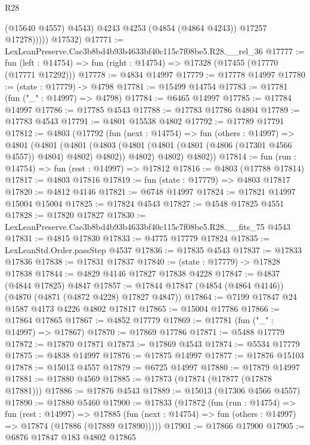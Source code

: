 \begin{lexlean}{R28}
\begin{coremodule}
                  (@15640 @4557)
                  @4543)
                @4243
                @4253
                (@4854 (@4864 @4243))
                @17257
                @17278)))))
      @17532)
@17771 := LexLeanPreserve.Cae3b8bd4b93b4633bf40c115c7f08be5.R28.__rel_36
@17777 := fun (left : @14754) => fun (right : @14754) => @17328 (@17455 (@17770 (@17771 @17292)))
@17778 := @4834 @14997
@17779 := @17778 @14997
@17780 := (state : @17779) -> @4798
@17781 := @15499 @14754
@17783 := @17781 (fun ("_" : @14997) => @4798)
@17784 := @6465 @14997
@17785 := @17784 @14997
@17786 := @17785 @4543
@17788 := @17783 @17786 @4804
@17789 := @17783 @4543
@17791 := @4801 @15538 @4802
@17792 := @17789 @17791
@17812 := @4803
    (@17792
      (fun (next : @14754) =>
      fun (others : @14997) =>
      @4801
        (@4801
          (@4801
            (@4803 (@4801 (@4801 (@4801 (@4806 (@17301 @4566 @4557)) @4804) @4802) @4802))
            @4802)
          @4802)
        @4802))
@17814 := fun (run : @14754) => fun (rest : @14997) => @17812
@17816 := @4803 (@17788 @17814)
@17817 := @4803 @17816
@17819 := fun (state : @17779) => @4803 @17817
@17820 := @4812 @4146
@17821 := @6748 @14997
@17824 := @17821 @14997 @15004 @15004
@17825 := @17824 @4543
@17827 := @4548 @17825 @4551
@17828 := @17820 @17827
@17830 := LexLeanPreserve.Cae3b8bd4b93b4633bf40c115c7f08be5.R28.__fits_75 @4543
@17831 := @4815 @17830
@17833 := @4775 @17779 @17824
@17835 := LexLeanStd.Order.passStep @4537
@17836 := @17835 @4543
@17837 := @17833 @17836
@17838 := @17831 @17837
@17840 := (state : @17779) -> @17828 @17838
@17844 := @4829 @4146 @17827 @17838 @4228
@17847 := @4837 (@4844 @17825) @4847
@17857 := @17844 @17847 (@4854 (@4864 @4146)) (@4870 (@4871 (@4872 @4228) @17827 @4847))
@17864 := @7199 @17847 @24 @1587 @4173 @4226 @4802 @17817
@17865 := @15004 @17786
@17866 := @17864 @17865
@17867 := @4852 @17779
@17869 := @17781 (fun ("_" : @14997) => @17867)
@17870 := @17869 @17786
@17871 := @5488 @17779
@17872 := @17870 @17871
@17873 := @17869 @4543
@17874 := @5534 @17779
@17875 := @4838 @14997
@17876 := @17875 @14997
@17877 := @17876 @15103
@17878 := @15013 @4557
@17879 := @6725 @14997
@17880 := @17879 @14997
@17881 := @17880 @4569
@17885 := @17873 (@17874 (@17877 (@17878 @17881)))
@17886 := @17876 @4543
@17889 := @15013 (@17306 @4566 @4557)
@17890 := @17880 @5460
@17900 := @17833
    (@17872
      (fun (run : @14754) =>
      fun (rest : @14997) =>
      @17885 (fun (next : @14754) => fun (others : @14997) => @17874 (@17886 (@17889 @17890)))))
@17901 := @17866 @17900
@17905 := @6876 @17847 @183 @4802 @17865

\end{coremodule}
\end{lexlean}
